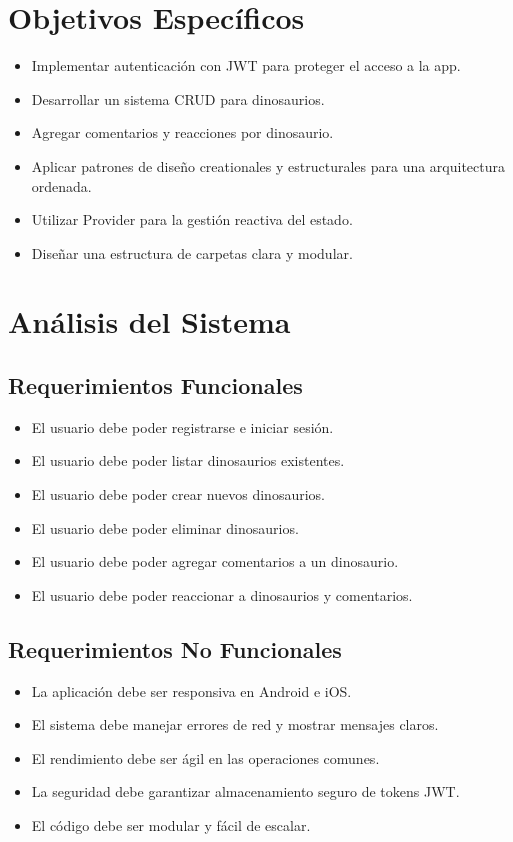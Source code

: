 \documentclass[12pt,a4paper]{article}
\begin{document}
\section{Objetivos Específicos}
\begin{itemize}
    \item Implementar autenticación con JWT para proteger el acceso a la app.
    \item Desarrollar un sistema CRUD para dinosaurios.
    \item Agregar comentarios y reacciones por dinosaurio.
    \item Aplicar patrones de diseño creationales y estructurales para una arquitectura ordenada.
    \item Utilizar Provider para la gestión reactiva del estado.
    \item Diseñar una estructura de carpetas clara y modular.
\end{itemize}

\section{Análisis del Sistema}

\subsection{Requerimientos Funcionales}
\begin{itemize}
    \item El usuario debe poder registrarse e iniciar sesión.
    \item El usuario debe poder listar dinosaurios existentes.
    \item El usuario debe poder crear nuevos dinosaurios.
    \item El usuario debe poder eliminar dinosaurios.
    \item El usuario debe poder agregar comentarios a un dinosaurio.
    \item El usuario debe poder reaccionar a dinosaurios y comentarios.
\end{itemize}

\subsection{Requerimientos No Funcionales}
\begin{itemize}
    \item La aplicación debe ser responsiva en Android e iOS.
    \item El sistema debe manejar errores de red y mostrar mensajes claros.
    \item El rendimiento debe ser ágil en las operaciones comunes.
    \item La seguridad debe garantizar almacenamiento seguro de tokens JWT.
    \item El código debe ser modular y fácil de escalar.
\end{itemize}
\end{document}
